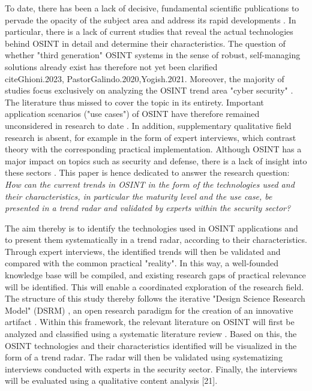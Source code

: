 \documentclass[10pt]{article}
\begin{document}
To date, there has been a lack of decisive, fundamental scientific publications to pervade the opacity of the subject area \cite{HerreraCubides.2020} and address its rapid developments \cite{Ghioni.2023, Williams.2018}. In particular, there is a lack of current studies that reveal the actual technologies behind OSINT in detail and determine their characteristics. The question of whether "third generation" OSINT systems in the sense of robust, self-managing solutions \cite{PastorGalindo.2019, PastorGalindo.2020} already exist has therefore not yet been clarified \\cite{Ghioni.2023, PastorGalindo.2020,Yogish.2021}. Moreover, the majority of studies focus exclusively on analyzing the OSINT trend area "cyber security" \cite{Hwang.2022, PastorGalindo.2019, Yogish.2021}. The literature thus missed to cover the topic in its entirety. Important application scenarios ("use cases") of OSINT have therefore remained unconsidered in research to date \cite{AlKilani.2021, Dokman.2020, Ghioni.2023}. In addition, supplementary qualitative field research is absent, for example in the form of expert interviews, which contrast theory with the corresponding practical implementation. Although OSINT has a major impact on topics such as security and defense, there is a lack of insight into these sectors \cite{HerreraCubides.2020,PastorGalindo.2019}. This paper is hence dedicated to answer the research question:  \textit{How can the current trends in OSINT in the form of the technologies used and their characteristics, in particular the maturity level and the use case, be presented in a trend radar and validated by experts within the security sector?}

The aim thereby is to identify the technologies used in OSINT applications and to present them systematically in a trend radar, according to their characteristics. Through expert interviews, the identified trends will then be validated and compared with the common practical "reality". In this way, a well-founded knowledge base will be compiled, and existing research gaps of practical relevance will be identified. This will enable a coordinated exploration of the research field. The structure of this study thereby follows the iterative "Design Science Research Model" (DSRM) \cite{Peffers.2007}, an open research paradigm for the creation of an innovative artifact \cite{vomBrocke.2020b}. Within this framework, the relevant literature on OSINT will first be analyzed and classified using a systematic literature review \cite{Webster.2002}. Based on this, the OSINT technologies and their characteristics identified will be visualized in the form of a trend radar. The radar will then be validated using systematizing interviews \cite{Bogner.2014} conducted with experts in the security sector. Finally, the interviews will be evaluated using a qualitative content analysis [21].
\end{document}
